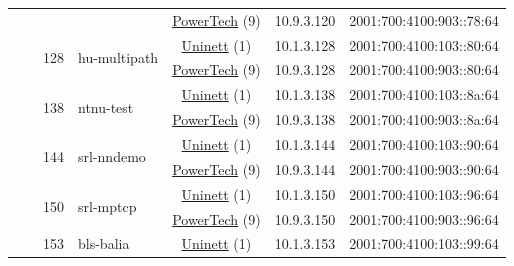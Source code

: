 \begin{small}
\begin{center}
\begin{longtable}{|c|c|c|c|c|c|c|c|}
  &  &  &  & \multicolumn{2}{|c|}{\tiny{\href{http://www.powertech.no}{PowerTech} (9)}} & \tiny{10.9.3.120} & \tiny{2001:700:4100:903::78:64} \\* \cline{3-3}\cline{4-4}\cline{5-5}\cline{6-6}\cline{7-7}\cline{8-8}
  &  & \multirow{2}{*}{\tiny{128}} & \multicolumn{1}{|l|}{\multirow{2}{*}{\tiny{hu-multipath}}} & \multicolumn{2}{|c|}{\tiny{\href{https://www.uninett.no}{Uninett} (1)}} & \tiny{10.1.3.128} & \tiny{2001:700:4100:103::80:64} \\* \cline{5-5}\cline{6-6}\cline{7-7}\cline{8-8}
  &  &  &  & \multicolumn{2}{|c|}{\tiny{\href{http://www.powertech.no}{PowerTech} (9)}} & \tiny{10.9.3.128} & \tiny{2001:700:4100:903::80:64} \\* \cline{3-3}\cline{4-4}\cline{5-5}\cline{6-6}\cline{7-7}\cline{8-8}
  &  & \multirow{2}{*}{\tiny{138}} & \multicolumn{1}{|l|}{\multirow{2}{*}{\tiny{ntnu-test}}} & \multicolumn{2}{|c|}{\tiny{\href{https://www.uninett.no}{Uninett} (1)}} & \tiny{10.1.3.138} & \tiny{2001:700:4100:103::8a:64} \\* \cline{5-5}\cline{6-6}\cline{7-7}\cline{8-8}
  &  &  &  & \multicolumn{2}{|c|}{\tiny{\href{http://www.powertech.no}{PowerTech} (9)}} & \tiny{10.9.3.138} & \tiny{2001:700:4100:903::8a:64} \\* \cline{3-3}\cline{4-4}\cline{5-5}\cline{6-6}\cline{7-7}\cline{8-8}
  &  & \multirow{2}{*}{\tiny{144}} & \multicolumn{1}{|l|}{\multirow{2}{*}{\tiny{srl-nndemo}}} & \multicolumn{2}{|c|}{\tiny{\href{https://www.uninett.no}{Uninett} (1)}} & \tiny{10.1.3.144} & \tiny{2001:700:4100:103::90:64} \\* \cline{5-5}\cline{6-6}\cline{7-7}\cline{8-8}
  &  &  &  & \multicolumn{2}{|c|}{\tiny{\href{http://www.powertech.no}{PowerTech} (9)}} & \tiny{10.9.3.144} & \tiny{2001:700:4100:903::90:64} \\* \cline{3-3}\cline{4-4}\cline{5-5}\cline{6-6}\cline{7-7}\cline{8-8}
  &  & \multirow{2}{*}{\tiny{150}} & \multicolumn{1}{|l|}{\multirow{2}{*}{\tiny{srl-mptcp}}} & \multicolumn{2}{|c|}{\tiny{\href{https://www.uninett.no}{Uninett} (1)}} & \tiny{10.1.3.150} & \tiny{2001:700:4100:103::96:64} \\* \cline{5-5}\cline{6-6}\cline{7-7}\cline{8-8}
  &  &  &  & \multicolumn{2}{|c|}{\tiny{\href{http://www.powertech.no}{PowerTech} (9)}} & \tiny{10.9.3.150} & \tiny{2001:700:4100:903::96:64} \\* \cline{3-3}\cline{4-4}\cline{5-5}\cline{6-6}\cline{7-7}\cline{8-8}
  &  & \multirow{2}{*}{\tiny{153}} & \multicolumn{1}{|l|}{\multirow{2}{*}{\tiny{bls-balia}}} & \multicolumn{2}{|c|}{\tiny{\href{https://www.uninett.no}{Uninett} (1)}} & \tiny{10.1.3.153} & \tiny{2001:700:4100:103::99:64} \\* \cline{5-5}\cline{6-6}\cline{7-7}\cline{8-8}

\end{longtable}
\end{center}
\end{small}
